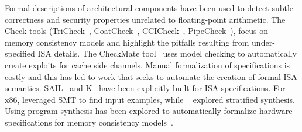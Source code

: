 Formal descriptions of architectural components have been used to detect subtle correctness and security properties unrelated to floating-point arithmetic.
The Check tools (TriCheck~\cite{trippel2017tricheck}, CoatCheck~\cite{lustig_coatcheck_2016}, 
CCICheck~\cite{manerkar_ccicheck_2015}, 
PipeCheck~\cite{lustig_pipecheck_2014}), focus on memory consistency models and highlight the pitfalls resulting from under-specified ISA details.
The CheckMate tool~\cite{trippel_checkmate_2018} uses model checking to automatically create exploits for cache side channels.
Manual formalization of specifications is costly and this has led to work that seeks to automate the creation of formal ISA semantics. SAIL~\cite{armstrong_isa_2019} and K~\cite{dasgupta_complete_2019} have been explicitly built for ISA specifications. For x86, \citet{godefroid-taly} leveraged SMT to find input examples, while ~\citet{heule_stratified_2016} explored stratified synthesis. Using program synthesis has been explored to automatically formalize hardware specifications for memory consistency models~\cite{hsiao2021synthesizing,norman2023pipesynth}.